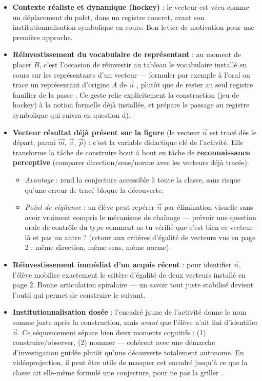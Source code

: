 \documentclass[11pt,a4paper]{article}
\newcommand{\Vj}[1]{\overrightarrow{#1}}
\begin{document}
\begin{itemize}[leftmargin=1.4em,itemsep=6pt, label=$\star$]
\item \textbf{Contexte réaliste et dynamique (hockey)} : le vecteur est
vécu comme un déplacement du palet, dans un registre concret, avant son
institutionnalisation symbolique en cours. Bon levier de motivation pour
une première approche.

\item \textbf{Réinvestissement du vocabulaire de représentant} : au
moment de placer $B$, c'est l'occasion de réinvestir au
tableau le vocabulaire installé en cours sur les représentants d'un
vecteur --- formuler par exemple à l'oral \og on trace un représentant
d'origine $A$ de $\Vj{u}$ \fg{}, plutôt que de rester au seul registre
familier de la \og passe \fg{}. Ce geste relie explicitement la
construction (jeu de hockey) à la notion formelle déjà installée, et
prépare le passage au registre symbolique qui suivra en question d).

\item \textbf{Vecteur résultat déjà présent sur la figure} (le vecteur
$\Vj{n}$ est tracé dès le départ, parmi $\Vj{m}$, $\Vj{v}$, $\Vj{p}$) :
c'est la variable didactique clé de l'activité. Elle transforme la tâche
de \og construire bout à bout \fg{} en tâche de \textbf{reconnaissance
perceptive} (comparer direction/sens/norme avec les vecteurs déjà
tracés).
\begin{itemize}[leftmargin=1.2em,itemsep=3pt, label=$\odot$]
\item \emph{Avantage} : rend la conjecture accessible à toute la classe,
sans risque qu'une erreur de tracé bloque la découverte.
\item \emph{Point de vigilance} : un élève peut repérer $\Vj{n}$ par
élimination visuelle sans avoir vraiment compris le mécanisme de
chaînage --- prévoir une question orale de contrôle du type \og comment
as-tu vérifié que c'est bien ce vecteur-là et pas un autre ? \fg{}
(retour aux critères d'égalité de vecteurs vus en page 2 : même
direction, même sens, même norme).
\end{itemize}

\item \textbf{Réinvestissement immédiat d'un acquis récent} : pour
identifier $\Vj{n}$, l'élève mobilise exactement le critère d'égalité de
deux vecteurs installé en page 2. Bonne articulation spiralaire --- un
savoir tout juste stabilisé devient l'outil qui permet de construire le
suivant.

\item \textbf{Institutionnalisation dosée} : l'encadré jaune de
l'activité donne le nom \og somme \fg{} juste après la construction,
mais \emph{avant} que l'élève n'ait fini d'identifier $\Vj{n}$. Ce séquencement sépare bien deux moments cognitifs :
(1) construire/observer, (2) nommer --- cohérent avec une démarche
d'investigation guidée plutôt qu'une découverte totalement autonome. En
vidéoprojection, il peut être utile de masquer cet encadré jusqu'à ce
que la classe ait elle-même formulé une conjecture, pour ne pas la
\og griller \fg{}.


\end{itemize}
\end{document}
